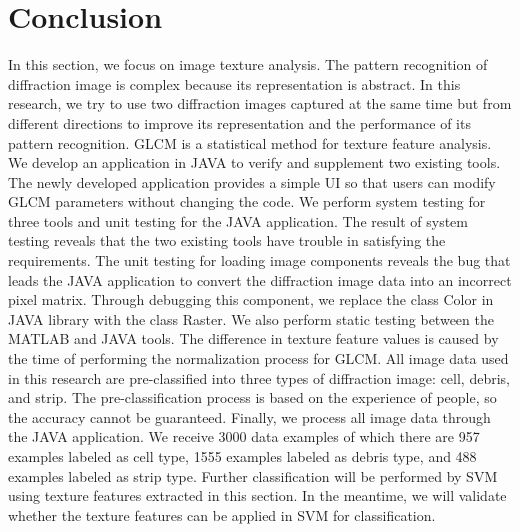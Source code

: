 \section{Conclusion}
In this section, we focus on image texture analysis. The pattern recognition of diffraction image is complex because its representation is abstract. In this research, we try to use two diffraction images captured at the same time but from different directions to improve its representation and the performance of its pattern recognition. GLCM is a statistical method for texture feature analysis. We develop an application in JAVA to verify and supplement two existing tools. The newly developed application provides a simple UI so that users can modify GLCM parameters without changing the code. We perform system testing for three tools and unit testing for the JAVA application. The result of system testing reveals that the two existing tools have trouble in satisfying the requirements. The unit testing for loading image components reveals the bug that leads the JAVA application to convert the diffraction image data into an incorrect pixel matrix. Through debugging this component, we replace the class Color in JAVA library with the class Raster. We also perform static testing between the MATLAB and JAVA tools. The difference in texture feature values is caused by the time of performing the normalization process for GLCM. All image data used in this research are pre-classified into three types of diffraction image: cell, debris, and strip. The pre-classification process is based on the experience of people, so the accuracy cannot be guaranteed. Finally, we process all image data through the JAVA application. We receive 3000 data examples of which there are 957 examples labeled as cell type, 1555 examples labeled as debris type, and 488 examples labeled as strip type.  Further classification will be performed by SVM using texture features extracted in this section. In the meantime, we will validate whether the texture features can be applied in SVM for classification. 